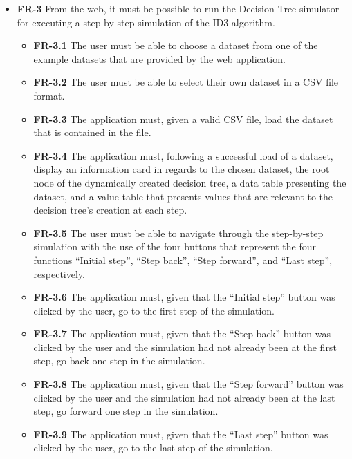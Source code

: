 \begin{itemize}
    \item \textbf{FR-3} From the web, it must be possible to run the Decision Tree simulator for executing a step-by-step simulation of the ID3 algorithm.
    \begin{itemize}
        \item \textbf{FR-3.1} The user must be able to choose a dataset from one of the example datasets that are provided by the web application.
        \item \textbf{FR-3.2} The user must be able to select their own dataset in a CSV file format.
        \item \textbf{FR-3.3} The application must, given a valid CSV file, load the dataset that is contained in the file.
        \item \textbf{FR-3.4} The application must, following a successful load of a dataset, display an information card in regards to the chosen dataset, the root node of the dynamically created decision tree, a data table presenting the dataset, and a value table that presents values that are relevant to the decision tree's creation at each step.
        \item \textbf{FR-3.5} The user must be able to navigate through the step-by-step simulation with the use of the four buttons that represent the four functions ``Initial step'', ``Step back'', ``Step forward'', and ``Last step'', respectively.
        \item \textbf{FR-3.6} The application must, given that the ``Initial step'' button was clicked by the user, go to the first step of the simulation.
        \item \textbf{FR-3.7} The application must, given that the ``Step back'' button was clicked by the user and the simulation had not already been at the first step, go back one step in the simulation.
        \item \textbf{FR-3.8} The application must, given that the ``Step forward'' button was clicked by the user and the simulation had not already been at the last step, go forward one step in the simulation.
        \item \textbf{FR-3.9} The application must, given that the ``Last step'' button was clicked by the user, go to the last step of the simulation.
    \end{itemize}
\end{itemize}

